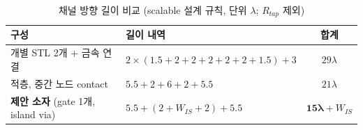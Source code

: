 \documentclass[journal]{IEEEtran}
\begin{document}
\begin{table}[!t]
\caption{채널 방향 길이 비교 (scalable 설계 규칙, 단위 $\lambda$; $R_{tap}$ 제외)}
\label{tab:area}
\centering\scriptsize
\begin{tabular}{@{}p{}p{}c@{}}
\toprule
구성 & 길이 내역 & 합계 \\ \midrule
개별 STL 2개 + 금속 연결 & $2\times(1.5+2+2+2+2+2+1.5)+3$ & $29\lambda$ \\
적층, 중간 노드 contact & $5.5+2+6+2+5.5$ & $21\lambda$ \\
\textbf{제안 소자} (gate 1개, island via) & $5.5+(2+W_{IS}+2)+5.5$ & $\mathbf{15\lambda}+W_{IS}$ \\ \bottomrule
\end{tabular}
\end{table}
\end{document}
